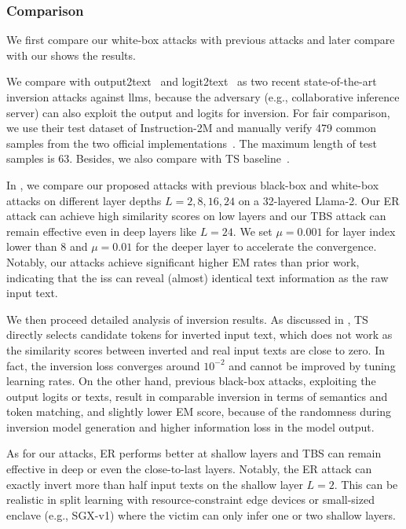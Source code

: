 \documentclass[letterpaper,twocolumn,10pt]{article}
\newcommand{\llama}{Llama}
\newcommand{\eg}{\hbox{{e.g.}}\xspace}
\newcommand{\bheading}[1]{{\vspace{4pt}\noindent{\textbf{#1}}}}
\newcommand{\iheading}[1]{{\vspace{4pt}\noindent{\textit{#1}}}}
\theoremstyle{definition}
\begin{document}
\subsubsection{Comparison}
We first compare our white-box attacks with previous attacks and later compare with our 
 shows the results.




\bheading{Baselines.}
We compare with output2text~\cite{zhang2024extracting} and 
logit2text~\cite{morris2024language} as two recent state-of-the-art inversion attacks against \acp{llm}, because the adversary (\eg, collaborative inference server) can also exploit the output and logits for inversion.
For fair comparison, we use their test dataset of Instruction-2M and manually verify 479 common samples from the two official implementations~\cite{morris2024language,zhang2024extracting}.
The maximum length of test samples is 63.
Besides, we also compare with TS baseline~\cite{song2020information}.



In , we compare our proposed attacks with previous black-box and white-box attacks on different layer depths $L=2, 8, 16, 24$ on a 32-layered \llama-2.
Our ER attack can achieve high similarity scores on low layers and our TBS attack can remain effective even in deep layers like $L=24$.
We set $\mu=0.001$ for layer index lower than 8 and $\mu=0.01$ for the deeper layer to accelerate the convergence. 
Notably, our attacks achieve significant higher EM rates than prior work, indicating that the \acp{is} can reveal (almost) identical text information as the raw input text.

\iheading{Cause Analysis.}
We then proceed detailed analysis of inversion results.
As discussed in , TS directly selects candidate tokens for inverted input text, which does not work as the similarity scores between inverted and real input texts are close to zero.
In fact, the inversion loss converges around $10^{-2}$ and cannot be improved by tuning learning rates.
On the other hand, previous black-box attacks, exploiting the output logits or texts, result in comparable inversion in terms of semantics and token matching, and slightly lower EM score, because of the randomness during inversion model generation and higher information loss in the model output.

As for our attacks, ER performs better at shallow layers and TBS can remain effective in deep or even the close-to-last layers.
Notably, the ER attack can exactly invert more than half input texts on the shallow layer $L=2$.
This can be realistic in split learning with resource-constraint edge devices or small-sized enclave (\eg, SGX-v1) where the victim can only infer one or two shallow layers.
\end{document}
